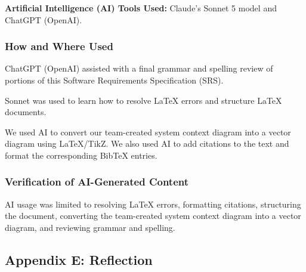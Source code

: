 \documentclass[12pt]{article}
\begin{document}
\textbf{Artificial Intelligence (AI) Tools Used:} Claude's Sonnet 5 model and
ChatGPT (OpenAI).

\subsubsection{How and Where Used}

ChatGPT (OpenAI) assisted with a final grammar and spelling review of portions
of this Software Requirements Specification (SRS).

Sonnet was used to learn how to resolve LaTeX errors and structure LaTeX
documents.

We used AI to convert our team-created system context diagram into a vector
diagram using LaTeX/TikZ. We also used AI to add citations to the text and
format the corresponding BibTeX entries.

\subsubsection{Verification of AI-Generated Content}

AI usage was limited to resolving LaTeX errors, formatting citations,
structuring the document, converting the team-created system context diagram
into a vector diagram, and reviewing grammar and spelling.

\subsection{Appendix E: Reflection}
\end{document}
